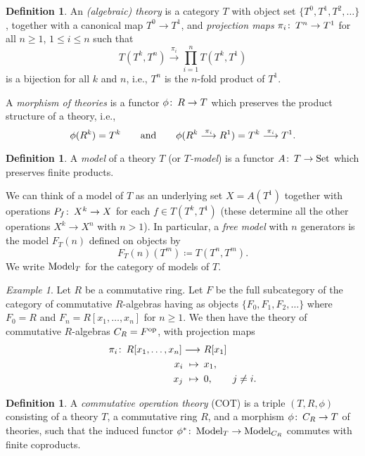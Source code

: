 \documentclass{gtpart}
\theoremstyle{definition}
\newtheorem{defn}[thm]{Definition}
\theoremstyle{remark}
\newtheorem{ex}[thm]{Example}
\def\co{\colon\thinspace}
\newcommand{\Set}{{\rm Set}}
\newcommand{\Model}{{\rm Model}}
\newcommand{\ad}{{\rm and}}
\newcommand{\ce}{\coloneqq}
\numberwithin{equation}{section}
\numberwithin{thm}{section}
\begin{document}
\begin{defn}
 An {\em (algebraic) theory} is a category $T$ with object set 
 $\{T^0,T^1,T^2,\ldots\}$, together with a canonical map $T^0 \to T^1$, 
 and {\em projection maps} $\pi_i\co T^n \to T^1$ for all $n \ge 1$, 
 $1 \le i \le n$ such that 
 \[
  T(T^k,T^n) \stackrel{\pi_i}{\longrightarrow} \prod_{i=1}^n T(T^k,T^1) 
 \]
 is a bijection for all $k$ and $n$, i.e., $T^n$ is the $n$-fold product 
 of $T^1$.  
 
 A {\em morphism of theories} is a functor $\phi\co R \to T$ which 
 preserves the product structure of a theory, i.e., 
 \[
  \phi(R^k) = T^k \qquad \ad \qquad 
  \phi(R^k \stackrel{\pi_i}{\longrightarrow} R^1) = 
  T^k \stackrel{\pi_i}{\longrightarrow} T^1.  
 \]
\end{defn}

\begin{defn}
 A {\em model} of a theory $T$ (or {\em $T$-model}) is a functor 
 $A\co T \to \Set$ which preserves finite products.  
\end{defn}

We can think of a model of $T$ as an underlying set $X = A(T^1)$ 
together with operations $P_f\co X^k \to X$ for each $f \in T(T^k,T^1)$ 
(these determine all the other operations $X^k \to X^n$ with $n>1$).  In 
particular, a {\em free model} with $n$ generators is the model $F_T(n)$ 
defined on objects by 
\[
 F_T(n)(T^m) \ce T(T^n,T^m).  
\]
We write $\Model_T$ for the category of models of $T$.  

\begin{ex}
 Let $R$ be a commutative ring.  Let $F$ be the full subcategory of the 
 category of commutative $R$-algebras having as objects 
 $\{F_0,F_1,F_2,\ldots\}$ where $F_0 = R$ and $F_n = R[x_1,\ldots,x_n]$ 
 for $n \ge 1$.  We then have the theory of commutative $R$-algebras 
 $C_R = F^{\rm op}$, with projection maps 
 \begin{equation*}
 \begin{split}
  \pi_i\co R[x_1,\ldots,x_n] \longrightarrow & ~ R[x_1] \\
  x_i ~ \mapsto \thinspace & ~ x_1, \\
  x_j ~ \mapsto \thinspace & ~ 0, \qquad j \neq i.  
 \end{split}
 \end{equation*}
\end{ex}

\begin{defn}
 A {\em commutative operation theory} (COT) is a triple $(T,R,\phi)$ 
 consisting of a theory $T$, a commutative ring $R$, and a morphism 
 $\phi\co C_R \to T$ of theories, such that the induced functor 
 $\phi^*\co \Model_T \to \Model_{C_R}$ commutes with finite coproducts.  
\end{defn}
\end{document}
